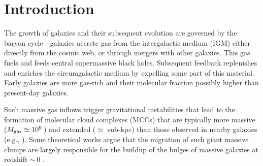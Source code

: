 \IfFileExists{emulateapjlegacy.cls}{\documentclass[iop]{emulateapjlegacy}}{\documentclass[iop]{emulateapj}}
\begin{document}

\section{Introduction}
The growth of galaxies and their subsequent evolution are governed by the baryon cycle---galaxies accrete gas from the intergalactic medium (IGM) 
     either directly from the cosmic web, or through mergers with other galaxies. This gas fuels \SF and feeds central
supermassive black holes. Subsequent feedback replenishes and enriches the circumgalactic medium 
   by expelling some
part of this material. 
    Early
galaxies 
are more gas-rich and their molecular fraction possibly higher 
   than
present-day galaxies.

Such massive gas inflows trigger gravitational instabilities that lead to the formation of molecular 
   cloud complexes (MCCs) 
that are typically more massive ($M_{\rm gas}\simeq 10^9$\,\Msun) and extended ($\simeq$ sub-kpc) than those observed in nearby galaxies (e.g., \citealt{Gabor13a, Hopkins14a, Inoue16a}).
%
Some theoretical works argue that the migration of such giant massive clumps are largely responsible for the buildup of the bulges of massive galaxies at redshift \z$\sim$\,0 \citep[e.g.,][]{Ceverino10a}.
\end{document}
